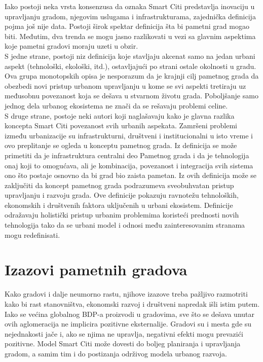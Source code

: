 \documentclass[a4paper,12pt]{article}
\begin{document}
{Iako postoji neka vrsta konsenzusa da oznaka Smart Citi predstavlja inovaciju u upravljanju gradom, njegovim uslugama i infrastrukturama, zajednička definicija pojma još nije data. Postoji širok spektar definicija šta bi pametni grad mogao biti. Međutim, dva trenda se mogu jasno razlikovati u vezi sa glavnim aspektima koje pametni gradovi moraju uzeti u obzir. \\

S jedne strane, postoji niz definicija koje stavljaju akcenat samo na jedan urbani aspekt (tehnološki, ekološki, itd.), ostavljajući po strani ostale okolnosti u gradu. Ova grupa monotopskih opisa je nesporazum da je krajnji cilj pametnog grada da obezbedi novi pristup urbanom upravljanju u kome se svi aspekti tretiraju uz međusobnu povezanost koja se dešava u stvarnom životu grada. Poboljšanje samo jednog dela urbanog ekosistema ne znači da se rešavaju problemi celine. \\

S druge strane, postoje neki autori koji naglašavaju kako je glavna razlika koncepta Smart Citi povezanost svih urbanih aspekata. Zamršeni problemi između urbanizacije su infrastrukturni, društveni i institucionalni u isto vreme i ovo preplitanje se ogleda u konceptu pametnog grada. Iz definicija se može primetiti da je infrastruktura centralni deo Pametnog grada i da je tehnologija onaj koji to omogućava, ali je kombinacija, povezanost i integracija svih sistema ono što postaje osnovno da bi grad bio zaista pametan. Iz ovih definicija može se zaključiti da koncept pametnog grada podrazumeva sveobuhvatan pristup upravljanju i razvoju grada. Ove definicije pokazuju ravnotežu tehnoloških, ekonomskih i društvenih faktora uključenih u urbani ekosistem. Definicije odražavaju holistički pristup urbanim problemima koristeći prednosti novih tehnologija tako da se urbani model i odnosi među zainteresovanim stranama mogu redefinisati.\\



\section{Izazovi pametnih gradova}	
\label{sec:termini_i_citiranje}

 Kako gradovi i dalje neumorno rastu, njihove izazove treba pažljivo razmotriti kako bi rast stanovništva, ekonomski razvoj i društveni napredak išli istim putem. Iako se većina globalnog BDP-a proizvodi u gradovima, sve što se dešava unutar ovih aglomeracija ne implicira pozitivne eksternalije. Gradovi su i mesta gde su nejednakosti jače i, ako se njima ne upravlja, negativni efekti mogu prevazići pozitivne. Model Smart Citi može dovesti do boljeg planiranja i upravljanja gradom, a samim tim i do postizanja održivog modela urbanog razvoja. \\

}
\end{document}

